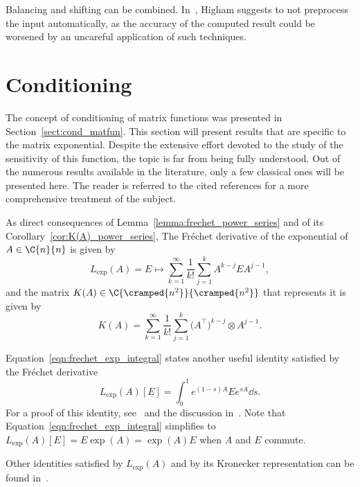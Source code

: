 Balancing and shifting can be combined. In~\cite[§~10.7.3]{higham:matfun_book}, Higham suggests to not preprocess the input automatically, as the accuracy of the computed result could be worsened by an uncareful application of such techniques.

\section{Conditioning}\label{sect:expm_conditioning}
The concept of conditioning of matrix functions was presented in Section~\ref{sect:cond_matfun}. This section will present results that are specific to the matrix exponential. Despite the extensive effort devoted to the study of the sensitivity of this function, the topic is far from being fully understood. Out of the numerous results available in the literature, only a few classical ones will be presented here. The reader is referred to the cited references for a more comprehensive treatment of the subject. 
\smallskip 

As direct consequences of Lemma~\ref{lemma:frechet_power_series} and of its Corollary~\ref{cor:K(A)_power_series}, The Fréchet derivative of the exponential of $A\in\C{n}{n}$ is given by
\[
	L_{\exp}(A)=E\mapsto\sum_{k=1}^{\infty}\frac{1}{k!}\sum_{j=1}^k A^{k-j}EA^{j-1},
\]
and the matrix $K(A)\in\C{\cramped{n^2}}{\cramped{n^2}}$ that represents it is given by
\[
	K(A)=\sum_{k=1}^{\infty}\frac{1}{k!}\sum_{j=1}^{k}\big(A^{\top}\big)^{k-j}\otimes A^{j-1}.
\]

Equation~\eqref{eqn:frechet_exp_integral} states another useful identity satisfied by the Fréchet derivative
\begin{equation}\label{eqn:frechet_exp_integral}
	L_{\exp}(A)[E] = \int_0^1 e^{(1-s)A}Ee^{sA}\dd{s}.
\end{equation}
For a proof of this identity, see~\cite[Prob.~10.1]{higham:matfun_book} and the discussion in~\cite[§~10.2]{higham:matfun_book}. Note that Equation~\eqref{eqn:frechet_exp_integral} simplifies to $L_{\exp}(A)[E]=E\exp(A)=\exp(A)E$ when $A$ and $E$ commute.

Other identities satisfied by $L_{\exp}(A)$ and by its Kronecker representation can be found in~\cite[§~10.2]{higham:matfun_book}.


